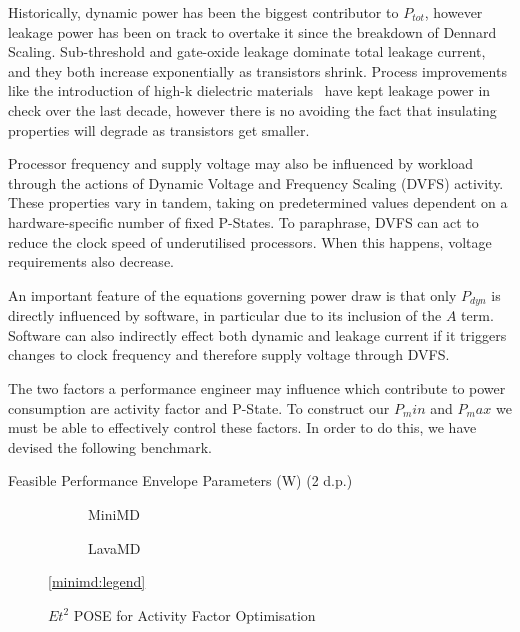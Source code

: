Historically, dynamic power has been the biggest contributor to $P_{tot}$, however leakage power has been on track to overtake it since the breakdown of Dennard Scaling.  Sub-threshold and gate-oxide leakage dominate total leakage current, and they both increase exponentially as transistors shrink. Process improvements like the introduction of high-k dielectric materials~\cite{jan:2009aa} have kept leakage power in check over the last decade, however there is no avoiding the fact that insulating properties will degrade as transistors get smaller.

Processor frequency and supply voltage may also be influenced by workload through the actions of Dynamic Voltage and Frequency Scaling (DVFS) activity.
These properties vary in tandem, taking on predetermined values dependent on a hardware-specific number of fixed P-States.
To paraphrase, DVFS can act to reduce the clock speed of underutilised processors. When this happens, voltage requirements also decrease.

An important feature of the equations governing power draw is that only $P_{dyn}$ is directly influenced by software, in particular due to its inclusion of the $A$ term. Software can also indirectly effect both dynamic and leakage current if it triggers changes to clock frequency and therefore supply voltage through DVFS.  

The two factors a performance engineer may influence which contribute to power consumption are activity factor and P-State.
To construct our $P_min$ and $P_max$ we must be able to effectively control these factors.
In order to do this, we have devised the following benchmark.

\begin{table}
\centering
\caption{Feasible Performance Envelope Parameters (W) (2 d.p.)}

\end{table} 

\begin{figure}[t]%
  \begin{subfigure}[t]{.5\linewidth}%
    \caption{MiniMD}%
  \end{subfigure}%
  \begin{subfigure}[t]{.5\linewidth}%
    \caption{LavaMD}%
  \end{subfigure}%
  \begin{center}%
    \ref{minimd:legend}%
  \end{center}%
  \caption{$Et^2$ POSE for Activity Factor Optimisation}%
  \label{fig:minimd}%
\end{figure}

